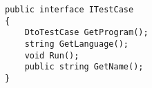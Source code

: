 

\begin{lstlisting}[caption=The interface used to implement the test cases, label={lst:test_case}]
public interface ITestCase
{
    DtoTestCase GetProgram();
    string GetLanguage();
    void Run();
    public string GetName();
}
\end{lstlisting}